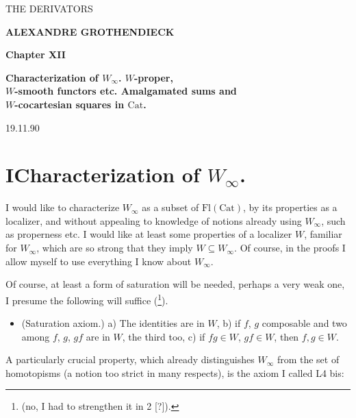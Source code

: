 \documentclass[11pt]{article}
\newcommand{\printedpage}[1]{\marginpar{\footnotesize p.~#1}}
\newcommand{\msp}[1]{\marginpar{\footnotesize [#1]}}
\newcommand{\Cat}{\mathrm{Cat}}
\begin{document}
\printedpage{--}

\begin{center}
{\Large \textsf{THE DERIVATORS}}

\bigskip

\textbf{ALEXANDRE GROTHENDIECK}

\bigskip\bigskip

\textbf{Chapter XII}

\medskip

\textbf{Characterization of $W_\infty$. $W$-proper,\\
$W$-smooth functors etc. Amalgamated sums and\\
$W$-cocartesian squares in $\Cat$.}
\end{center}

\clearpage


\printedpage{1}

\msp{page 1}

\hfill 19.11.90

\section*{I\quad Characterization of $W_\infty$.}

I would like to characterize $W_\infty$ as a subset of $\mathrm{Fl}(\Cat)$, by its properties as a localizer, and without appealing to knowledge of notions already using $W_\infty$, such as properness etc. I would like at least some properties of a localizer $W$, familiar for $W_\infty$, which are so strong that they imply $W \subseteq W_\infty$. Of course, in the proofs I allow myself to use everything I know about $W_\infty$.

Of course, at least a form of saturation will be needed, perhaps a very weak one, I presume the following will suffice (\footnote{(no, I had to strengthen it in 2 [?]).}).

\begin{itemize}[leftmargin=*]
\item[\textbf{W(1)}] (Saturation axiom.) a) The identities are in $W$, b) if $f$, $g$ composable and two among $f$, $g$, $gf$ are in $W$, the third too, c) if $fg \in W$, $gf \in W$, then $f, g \in W$.
\end{itemize}

A particularly crucial property, which already distinguishes $W_\infty$ from the set of homotopisms (a notion too strict in many respects), is the axiom I called L4 bis:
\end{document}

